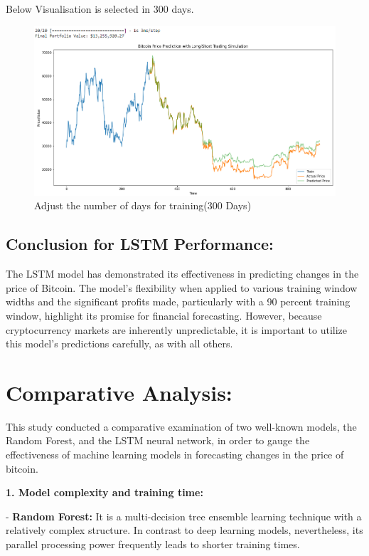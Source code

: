 Below Visualisation is selected in 300 days.

\begin{figure}[H]
\centering
\includegraphics[scale=0.65]{fig14.jpg}
\caption{Adjust the number of days for training(300 Days)}
\label{Adjust the number of days for training}
\end{figure}



\subsection{Conclusion for LSTM Performance:}

The LSTM model has demonstrated its effectiveness in predicting changes in the price of Bitcoin. The model's flexibility when applied to various training window widths and the significant profits made, particularly with a 90 percent training window, highlight its promise for financial forecasting. However, because cryptocurrency markets are inherently unpredictable, it is important to utilize this model's predictions carefully, as with all others.

\section{Comparative Analysis:}

This study conducted a comparative examination of two well-known models, the Random Forest, and the LSTM neural network, in order to gauge the effectiveness of machine learning models in forecasting changes in the price of bitcoin.

\textbf{1.	Model complexity and training time:}

-	 \textbf{Random Forest:} It is a multi-decision tree ensemble learning technique with a relatively complex structure. In contrast to deep learning models, nevertheless, its parallel processing power frequently leads to shorter training times.

